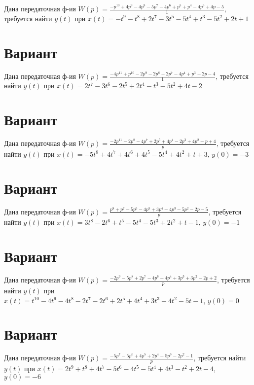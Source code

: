 \documentclass{article}
\begin{document}
Дана передаточная ф-ия $W(p)=\frac{-p^{10}+4p^{9}-4p^{8}-5p^{7}-4p^{6}+p^{5}+p^{4}-4p^{3}+4p-5}{1}$, требуется найти $y(t)$ при $x(t)=-t^{9}-t^{8}+2t^{7}-3t^{5}-5t^{4}+t^{3}-5t^{2}+2t+1$



\section{Вариант}

Дана передаточная ф-ия $W(p)=\frac{-4p^{11}+p^{10}-2p^{9}-2p^{8}+2p^{7}-4p^{4}+p^{3}+2p-4}{1}$, требуется найти $y(t)$ при $x(t)=2t^{7}-3t^{6}-2t^{5}+2t^{4}-t^{3}-5t^{2}+4t-2$



\section{Вариант}

Дана передаточная ф-ия $W(p)=\frac{-2p^{11}-2p^{8}-4p^{7}+2p^{5}+4p^{4}-2p^{3}+4p^{2}-p+4}{p}$, требуется найти $y(t)$ при $x(t)=-5t^{8}+4t^{7}+4t^{6}+4t^{5}-5t^{4}+4t^{2}+t+3$, $y(0)=-3$



\section{Вариант}

Дана передаточная ф-ия $W(p)=\frac{p^{8}+p^{7}-5p^{6}-4p^{5}+3p^{4}-4p^{3}-5p^{2}-2p-5}{p}$, требуется найти $y(t)$ при $x(t)=3t^{8}-2t^{6}+t^{5}-5t^{4}-5t^{3}+2t^{2}+t-1$, $y(0)=-1$



\section{Вариант}

Дана передаточная ф-ия $W(p)=\frac{-2p^{9}-5p^{8}+2p^{7}-4p^{6}-4p^{4}+3p^{3}+3p^{2}-2p+2}{p}$, требуется найти $y(t)$ при $x(t)=t^{10}-4t^{9}-4t^{8}-2t^{7}-2t^{6}+2t^{5}+4t^{4}+3t^{3}-4t^{2}-5t-1$, $y(0)=0$



\section{Вариант}

Дана передаточная ф-ия $W(p)=\frac{-5p^{7}-5p^{6}+4p^{5}+2p^{4}-5p^{3}-2p^{2}-1}{p}$, требуется найти $y(t)$ при $x(t)=2t^{9}+t^{8}+4t^{7}-5t^{6}-4t^{5}-5t^{4}+4t^{3}-t^{2}+2t-4$, $y(0)=-6$
\end{document}
